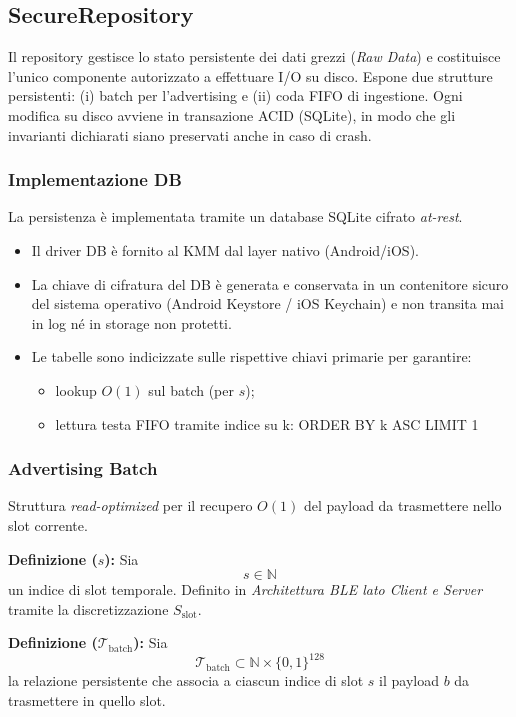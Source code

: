 \documentclass[a4paper,11pt,table,dvipsnames]{article}
\begin{document}
\subsection{SecureRepository}
Il repository gestisce lo stato persistente dei dati grezzi (\emph{Raw Data}) e costituisce l’unico componente autorizzato a effettuare I/O su disco.
Espone due strutture persistenti: (i) batch per l’advertising e (ii) coda FIFO di ingestione.
Ogni modifica su disco avviene in transazione ACID (SQLite), in modo che gli invarianti dichiarati siano preservati anche in caso di crash.

\subsubsection{Implementazione DB}
La persistenza è implementata tramite un database SQLite cifrato \emph{at-rest}.
\begin{itemize}
    \item Il driver DB è fornito al KMM dal layer nativo (Android/iOS).
    \item La chiave di cifratura del DB è generata e conservata in un contenitore sicuro del sistema operativo (Android Keystore / iOS Keychain) e non transita mai in log né in storage non protetti.
    \item Le tabelle sono indicizzate sulle rispettive chiavi primarie per garantire:
          \begin{itemize}[nosep]
              \item lookup \(O(1)\) sul batch (per \(s\));
              \item lettura testa FIFO tramite indice su k: ORDER BY k ASC LIMIT 1
          \end{itemize}
\end{itemize}

\subsubsection{Advertising Batch}
Struttura \emph{read-optimized} per il recupero \(O(1)\) del payload da trasmettere nello slot corrente.

\textbf{Definizione (\(s\)):}
Sia
\[
    s \in \mathbb{N}
\]
un indice di slot temporale.
Definito in \emph{Architettura BLE lato Client e Server} tramite la discretizzazione \(S_{\text{slot}}\).

\textbf{Definizione (\(\mathcal{T}_{\text{batch}}\)):}
Sia
\[
    \mathcal{T}_{\text{batch}} \subset \mathbb{N} \times \{0,1\}^{128}
\]
la relazione persistente che associa a ciascun indice di slot \(s\) il payload \(b\) da trasmettere in quello slot.
\end{document}

